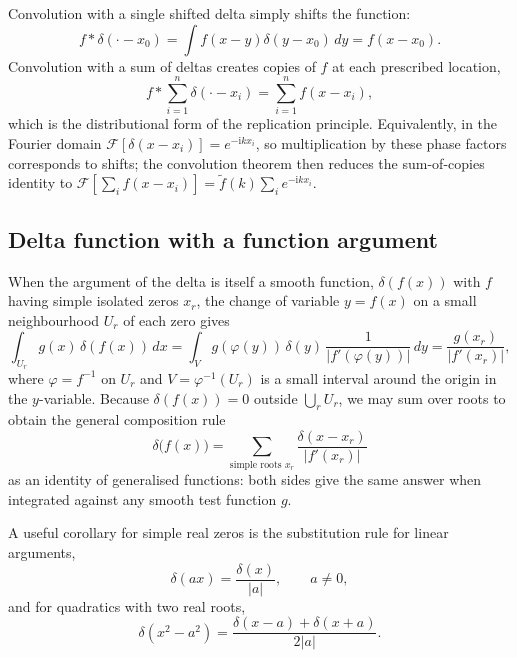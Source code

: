 Convolution with a single shifted delta simply shifts the function:
\begin{equation}
f*\delta(\cdot-x_0)=\int f(x-y)\delta(y-x_0)\,dy=f(x-x_0).
\end{equation}
Convolution with a sum of deltas creates copies of $f$ at each prescribed location,
\begin{equation}
f*\sum_{i=1}^n\delta(\cdot-x_i)=\sum_{i=1}^n f(x-x_i),
\end{equation}
which is the distributional form of the replication principle. Equivalently, in the Fourier domain $\mathcal{F}[\delta(x-x_i)]=e^{-\mathrm{i}kx_i}$, so multiplication by these phase factors corresponds to shifts; the convolution theorem then reduces the sum-of-copies identity to $\mathcal{F}[\sum_i f(x-x_i)]=\widetilde f(k)\sum_i e^{-\mathrm{i}kx_i}$.

\subsection{Delta function with a function argument}

When the argument of the delta is itself a smooth function, $\delta(f(x))$ with $f$ having simple isolated zeros $x_r$, the change of variable $y=f(x)$ on a small neighbourhood $U_r$ of each zero gives
\begin{equation}
\int_{U_r}g(x)\,\delta(f(x))\,dx
=\int_V g(\varphi(y))\,\delta(y)\,\frac{1}{|f'(\varphi(y))|}\,dy
=\frac{g(x_r)}{|f'(x_r)|},
\end{equation}
where $\varphi=f^{-1}$ on $U_r$ and $V=\varphi^{-1}(U_r)$ is a small interval around the origin in the $y$-variable. Because $\delta(f(x))=0$ outside $\bigcup_r U_r$, we may sum over roots to obtain the general composition rule
\begin{equation}
\boxed{\;\delta\bigl(f(x)\bigr)=\sum_{\text{simple roots }x_r}\frac{\delta(x-x_r)}{|f'(x_r)|}\;}
\end{equation}
as an identity of generalised functions: both sides give the same answer when integrated against any smooth test function $g$.

A useful corollary for simple real zeros is the substitution rule for linear arguments,
\begin{equation}
\delta(ax)=\frac{\delta(x)}{|a|},\qquad a\neq 0,
\end{equation}
and for quadratics with two real roots,
\begin{equation}
\delta(x^2-a^2)=\frac{\delta(x-a)+\delta(x+a)}{2|a|}.
\end{equation}

